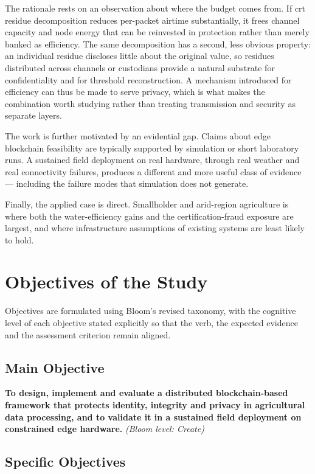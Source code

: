 \documentclass[12pt,a4paper,oneside]{book}
\begin{document}
The rationale rests on an observation about where the budget comes from. If
\gls{crt} residue decomposition reduces per-packet airtime substantially, it
frees channel capacity and node energy that can be reinvested in protection
rather than merely banked as efficiency. The same decomposition has a second,
less obvious property: an individual residue discloses little about the original
value, so residues distributed across channels or custodians provide a natural
substrate for confidentiality and for threshold reconstruction. A mechanism
introduced for efficiency can thus be made to serve privacy, which is what makes
the combination worth studying rather than treating transmission and security as
separate layers.

The work is further motivated by an evidential gap. Claims about edge blockchain
feasibility are typically supported by simulation or short laboratory runs. A
sustained field deployment on real hardware, through real weather and real
connectivity failures, produces a different and more useful class of evidence —
including the failure modes that simulation does not generate.

Finally, the applied case is direct. Smallholder and arid-region agriculture is
where both the water-efficiency gains and the certification-fraud exposure are
largest, and where infrastructure assumptions of existing systems are least
likely to hold.

\section{Objectives of the Study}
\label{sec:objectives}

Objectives are formulated using Bloom's revised taxonomy, with the cognitive
level of each objective stated explicitly so that the verb, the expected
evidence and the assessment criterion remain aligned.

\subsection{Main Objective}
\label{subsec:main_objective}

\textbf{To design, implement and evaluate a distributed blockchain-based
framework that protects identity, integrity and privacy in agricultural data
processing, and to validate it in a sustained field deployment on constrained
edge hardware.} \emph{(Bloom level: Create)}

\subsection{Specific Objectives}
\label{subsec:specific_objectives}
\end{document}
